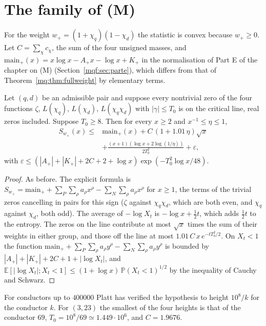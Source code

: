 \section{The family of (M)}\label{gbm:sec:family}

For the weight $w_+=(1+\chi_q)(1-\chi_d)$ the statistic is convex because $w_+\ge0$. Let $C=\sum_\chi c_\chi$, the sum of the four unsigned masses, and $\mathrm{main}_+(x)=x\log x-A_+x-\log x+K_+$ in the normalisation of Part E of the chapter on (M) (Section~\ref{mqf:sec:parte}), which differs from that of Theorem~\ref{mq:thm:fullweight} by elementary terms.

\begin{theorem}\label{gbm:thm:family}
Let $(q,d)$ be an admissible pair and suppose every nontrivial zero of the four functions $\zeta$, $L(\chi_q)$, $L(\chi_d)$, $L(\chi_q\chi_d)$ with $|\gamma|\le T_0$ is on the critical line, real zeros included. Suppose $T_0\ge8$. Then for every $x\ge2$ and $x^{-1}\le\eta\le1$,
\[
\begin{aligned}
S_{w_+}(x)\le{}&\mathrm{main}_+(x)+C\,(1+1.01\,\eta)\sqrt x\\&+\frac{(x+1)(\log x+2\log(1/\eta))}{2T_0^2}+\varepsilon ,
\end{aligned}
\]
with $\varepsilon\le(|A_+|+|K_+|+2C+2+\log x)\exp(-T_0^2\log x/48)$.
\end{theorem}

\begin{proof}
As before. The explicit formula is $S_{w_+}=\mathrm{main}_+ +\sum_P\sum_\rho a_\rho x^\rho-\sum_N\sum_\rho a_\rho x^\rho$ for $x\ge1$, the terms of the trivial zeros cancelling in pairs for this sign ($\zeta$ against $\chi_q\chi_d$, which are both even, and $\chi_q$ against $\chi_d$, both odd). The average of $-\log X_t$ is $-\log x+\frac12t$, which adds $\frac12t$ to the entropy. The zeros on the line contribute at most $\sqrt x$ times the sum of their weights in either group, and those off the line at most $1.01\,C\,x\,e^{-tT_0^2/2}$. On $X_t<1$ the function $\mathrm{main}_++\sum_P\sum_\rho a_\rho y^\rho-\sum_N\sum_\rho a_\rho y^\rho$ is bounded by $|A_+|+|K_+|+2C+1+|\log X_t|$, and $\mathbb E[|\log X_t|;X_t<1]\le(1+\log x)\,\mathbb P(X_t<1)^{1/2}$ by the inequality of Cauchy and Schwarz.
\end{proof}

For conductors up to $400000$ Platt \cite{Platt16} has verified the hypothesis to height $10^8/k$ for the conductor $k$. For $(3,23)$ the smallest of the four heights is that of the conductor $69$, $T_0=10^8/69\simeq1.449\cdot10^6$, and $C=1.9676$.

